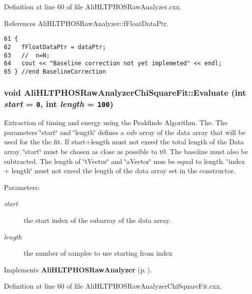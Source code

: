 Definition at line 60 of file Ali\-HLTPHOSRaw\-Analyzer.cxx.

References Ali\-HLTPHOSRaw\-Analyzer::f\-Float\-Data\-Ptr.

\footnotesize\begin{verbatim}61 {
62   fFloatDataPtr = dataPtr;  
63   //  n=N;
64   cout << "Baseline correction not yet implemeted" << endl;
65 } //end BaselineCorrection
\end{verbatim}\normalsize 


\subsubsection{\setlength{\rightskip}{0pt plus 5cm}void Ali\-HLTPHOSRaw\-Analyzer\-Chi\-Square\-Fit::Evaluate (int {\em start} = {\tt 0}, int {\em length} = {\tt 100})\hspace{0.3cm}{\tt  [virtual]}}\label{classAliHLTPHOSRawAnalyzerChiSquareFit_AliHLTPHOSRawAnalyzerChiSquareFita4}


Extraction of timing and energy using the Peakfinde Algorithm. The. The parameters \char`\"{}start\char`\"{} and \char`\"{}length\char`\"{} defines a sub array of the data array that will be used for the the fit. If start+length must not exeed the total length of the Data array. \char`\"{}start\char`\"{} must be chosen as close as possible to t0. The baseline must also be subtracted. The length of \char`\"{}t\-Vector\char`\"{} and \char`\"{}a\-Vector\char`\"{} mus be equal to length. \char`\"{}index + length\char`\"{} must not exeed the length of the data array set in the constructor. \begin{Desc}
\item[Parameters:]
\begin{description}
\item[{\em start}]the start index of the subarray of the data array. \item[{\em length}]the number of samples to use starting from index \end{description}
\end{Desc}


Implements {\bf Ali\-HLTPHOSRaw\-Analyzer} {\rm (p.\,\pageref{classAliHLTPHOSRawAnalyzer_AliHLTPHOSRawAnalyzerPeakFindera17})}.

Definition at line 60 of file Ali\-HLTPHOSRaw\-Analyzer\-Chi\-Square\-Fit.cxx.

